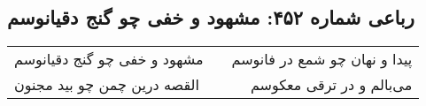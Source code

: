 \begin{center}
\section*{رباعی شماره ۴۵۲: مشهود و خفی چو گنج دقیانوسم}
\label{sec:sh452}
\begin{longtable}{l p{0.5cm} r}
مشهود و خفی چو گنج دقیانوسم
&&
پیدا و نهان چو شمع در فانوسم
\\
القصه درین چمن چو بید مجنون
&&
می‌بالم و در ترقی معکوسم
\\
\end{longtable}
\end{center}
